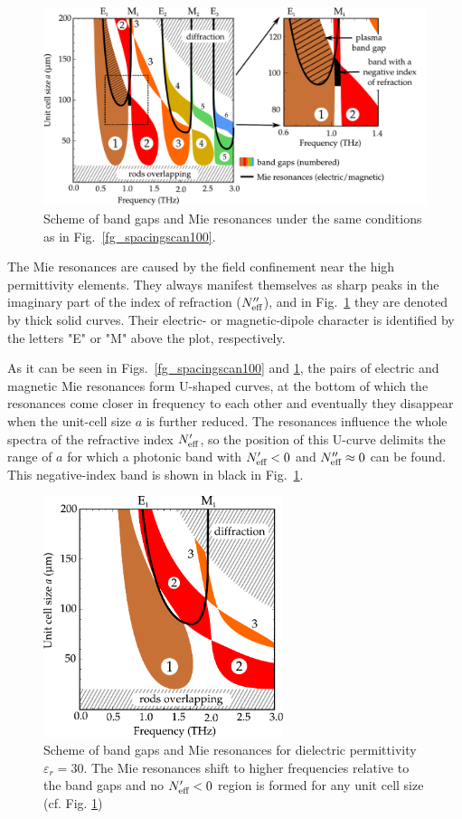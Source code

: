 \begin{figure}
    \includegraphics[width=15cm]{img/ERods_eps100_spacingscan_drawn_bands.pdf}
    \caption{Scheme of band gaps and Mie resonances under the same conditions as
    in Fig.~\ref{fg_spacingscan100}.}
\label{fg_drawn100}
\end{figure}




The Mie resonances are caused by the field confinement near the high permittivity elements. They always manifest themselves as sharp peaks in the imaginary part of the index of refraction ($N_{\text{eff} }''$), and in Fig.~\ref{fg_drawn100} they are denoted by thick solid curves. Their electric- or magnetic-dipole character is identified by the letters "E" or "M" above the plot, respectively.

As it can be seen in Figs.~\ref{fg_spacingscan100} and \ref{fg_drawn100}, the pairs of electric and magnetic Mie resonances form U-shaped curves, at the bottom of which the resonances come closer in frequency to each other and eventually they disappear when the unit-cell size $a$ is further reduced. The resonances influence the whole spectra of the refractive index $N_{\text{eff} }'$, so the position of this U-curve delimits the range of $a$ for which a photonic band with $N_{\text{eff} }' < 0$ and $N_{\text{eff} }'' \approx 0$ can be found. This negative-index band is shown in black in Fig.~\ref{fg_drawn100}.

\begin{figure}
	\centering
    \includegraphics[width=7cm]{img/ERods_eps030_spacingscan_drawn_bands.pdf}
    \caption{Scheme of band gaps and Mie resonances for dielectric permittivity $\varepsilon_r = 30$. The Mie resonances shift to higher frequencies relative to the band gaps and no $N_{\text{eff} }'<0$ region is formed for any unit cell size (cf. Fig. \ref{fg_drawn100})}
\label{fg_drawn030}
\end{figure}

